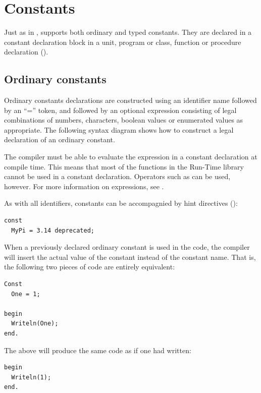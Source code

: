 \chapter{Constants}
 
Just as in \tp, \fpc supports both ordinary and typed constants. They are
declared in a constant declaration block in a unit, program or class, function or
procedure declaration ().

\section{Ordinary constants}
 
Ordinary constants declarations are constructed using an identifier name
followed by an ``='' token, and followed by an optional expression consisting
of legal combinations of numbers, characters, boolean values or enumerated
values as appropriate. The following syntax diagram shows how to construct
a legal declaration of an ordinary constant.



The compiler must be able to evaluate the expression in a constant
declaration at compile time.  This means that most of the functions
in the Run-Time library cannot be used in a constant
declaration.
Operators such as  can be used, however.
For more information on expressions, see .

As with all identifiers, constants can be accompagnied by hint directives
():
\begin{verbatim}
const
  MyPi = 3.14 deprecated;
\end{verbatim}

When a previously declared ordinary constant is used in the code, the compiler will insert
the actual value of the constant instead of the constant name. That is, the
following two pieces of code are entirely equivalent:

\begin{verbatim}
Const
  One = 1;

begin
  Writeln(One);
end.
\end{verbatim}
The above will produce the same code as if one had written:
\begin{verbatim}
begin
  Writeln(1);
end.
\end{verbatim}

